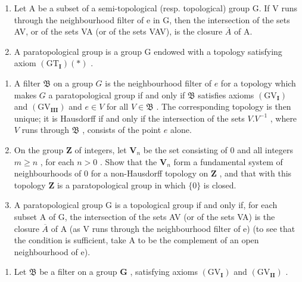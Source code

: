 \begin{enumerate}
\def\labelenumi{\arabic{enumi})}
\setcounter{enumi}{2}
\item
  Let A be a subset of a semi-topological (resp. topological) group G. If V runs through the neighbourhood filter of e in G, then the intersection of the sets AV, or of the sets VA (or of the sets VAV), is the closure \(\overline{A}\) of A.
\item
  A paratopological group is a group G endowed with a topology satisfying axiom \((\mathrm{GT}_{\mathbf{I}})(*)\) .
\end{enumerate}

\begin{enumerate}
\def\labelenumi{\alph{enumi})}
\item
  A filter \(\mathfrak{B}\) on a group \(G\) is the neighbourhood filter of \(e\) for a topology which makes \(G\) a paratopological group if and only if \(\mathfrak{B}\) satisfies axioms \((\mathrm{GV}_{\mathbf{I}})\) and \((\mathrm{GV}_{\mathbf{III}})\) and \(e \in V\) for all \(V \in \mathfrak{B}\) . The corresponding topology is then unique; it is Hausdorff if and only if the intersection of the sets \(V.V^{-1}\) , where \(V\) runs through \(\mathfrak{B}\) , consists of the point \(e\) alone.
\item
  On the group \(\mathbf{Z}\) of integers, let \(\mathbf{V}_n\) be the set consisting of \(0\) and all integers \(m \geqslant n\) , for each \(n > 0\) . Show that the \(\mathbf{V}_n\) form a fundamental system of neighbourhoods of \(0\) for a non-Hausdorff topology on \(\mathbf{Z}\) , and that with this topology \(\mathbf{Z}\) is a paratopological group in which \(\{0\}\) is closed.
\item
  A paratopological group G is a topological group if and only if, for each subset A of G, the intersection of the sets AV (or of the sets VA) is the closure \(\overline{A}\) of A (as V runs through the neighbourhood filter of e) (to see that the condition is sufficient, take A to be the complement of an open neighbourhood of e).
\end{enumerate}

\begin{enumerate}
\def\labelenumi{\arabic{enumi})}
\setcounter{enumi}{4}
\tightlist
\item
  Let \(\mathfrak{B}\) be a filter on a group \(\mathbf{G}\) , satisfying axioms \((\mathrm{GV}_{\mathbf{I}})\) and \((\mathrm{GV}_{\mathbf{II}})\) .
\end{enumerate}

